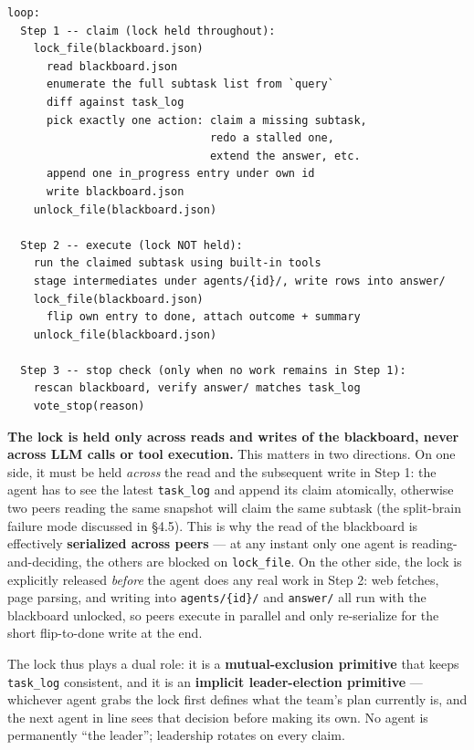 \documentclass[11pt]{article}
\newcommand{\code}[1]{\texttt{#1}}
\begin{document}
\begin{lstlisting}[style=pseudo]
loop:
  Step 1 -- claim (lock held throughout):
    lock_file(blackboard.json)
      read blackboard.json
      enumerate the full subtask list from `query`
      diff against task_log
      pick exactly one action: claim a missing subtask,
                               redo a stalled one,
                               extend the answer, etc.
      append one in_progress entry under own id
      write blackboard.json
    unlock_file(blackboard.json)

  Step 2 -- execute (lock NOT held):
    run the claimed subtask using built-in tools
    stage intermediates under agents/{id}/, write rows into answer/
    lock_file(blackboard.json)
      flip own entry to done, attach outcome + summary
    unlock_file(blackboard.json)

  Step 3 -- stop check (only when no work remains in Step 1):
    rescan blackboard, verify answer/ matches task_log
    vote_stop(reason)
\end{lstlisting}

\textbf{The lock is held only across reads and writes of the blackboard, never across LLM calls or tool execution.} This matters in two directions. On one side, it must be held \emph{across} the read and the subsequent write in Step 1: the agent has to see the latest \code{task\_log} and append its claim atomically, otherwise two peers reading the same snapshot will claim the same subtask (the split-brain failure mode discussed in \S4.5). This is why the read of the blackboard is effectively \textbf{serialized across peers} --- at any instant only one agent is reading-and-deciding, the others are blocked on \code{lock\_file}. On the other side, the lock is explicitly released \emph{before} the agent does any real work in Step 2: web fetches, page parsing, and writing into \code{agents/\{id\}/} and \code{answer/} all run with the blackboard unlocked, so peers execute in parallel and only re-serialize for the short flip-to-done write at the end.

The lock thus plays a dual role: it is a \textbf{mutual-exclusion primitive} that keeps \code{task\_log} consistent, and it is an \textbf{implicit leader-election primitive} --- whichever agent grabs the lock first defines what the team's plan currently is, and the next agent in line sees that decision before making its own. No agent is permanently ``the leader''; leadership rotates on every claim.

\end{document}
